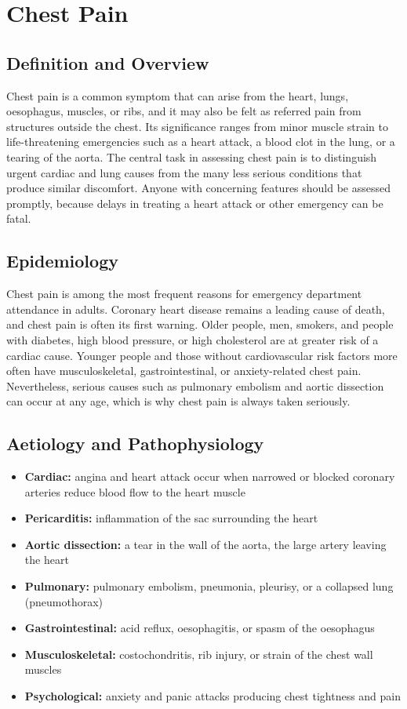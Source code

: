 \chapter{Chest Pain}

\section*{Definition and Overview}
Chest pain is a common symptom that can arise from the heart, lungs, oesophagus, muscles, or ribs, and it may also be felt as referred pain from structures outside the chest. Its significance ranges from minor muscle strain to life-threatening emergencies such as a heart attack, a blood clot in the lung, or a tearing of the aorta. The central task in assessing chest pain is to distinguish urgent cardiac and lung causes from the many less serious conditions that produce similar discomfort. Anyone with concerning features should be assessed promptly, because delays in treating a heart attack or other emergency can be fatal.

\section*{Epidemiology}
Chest pain is among the most frequent reasons for emergency department attendance in adults. Coronary heart disease remains a leading cause of death, and chest pain is often its first warning. Older people, men, smokers, and people with diabetes, high blood pressure, or high cholesterol are at greater risk of a cardiac cause. Younger people and those without cardiovascular risk factors more often have musculoskeletal, gastrointestinal, or anxiety-related chest pain. Nevertheless, serious causes such as pulmonary embolism and aortic dissection can occur at any age, which is why chest pain is always taken seriously.

\section*{Aetiology and Pathophysiology}
\begin{itemize}
    \item \textbf{Cardiac:} angina and heart attack occur when narrowed or blocked coronary arteries reduce blood flow to the heart muscle
    \item \textbf{Pericarditis:} inflammation of the sac surrounding the heart
    \item \textbf{Aortic dissection:} a tear in the wall of the aorta, the large artery leaving the heart
    \item \textbf{Pulmonary:} pulmonary embolism, pneumonia, pleurisy, or a collapsed lung (pneumothorax)
    \item \textbf{Gastrointestinal:} acid reflux, oesophagitis, or spasm of the oesophagus
    \item \textbf{Musculoskeletal:} costochondritis, rib injury, or strain of the chest wall muscles
    \item \textbf{Psychological:} anxiety and panic attacks producing chest tightness and pain
\end{itemize}

